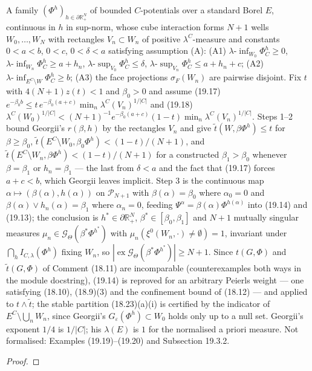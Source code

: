 \begin{theorem}
    A family $(\Phi^h)_{h\in\partial\mathbb R^N_+}$ of bounded $C$-potentials over a standard Borel
    $E$, continuous in $h$ in sup-norm, whose cube interaction forms $N+1$ wells $W_0,\dots,W_N$
    with rectangles $V_n \subset W_n$ of positive $\lambda^C$-measure and constants
    $0<a<b$, $0<c$, $0<\delta<a$ satisfying assumption (A): (A1) $\lambda\text{-}\inf_{W_0}\Phi^h_C
    \ge 0$, $\lambda\text{-}\inf_{W_n}\Phi^h_C \ge a+h_n$, $\lambda\text{-}\sup_{V_0}\Phi^h_C \le
    \delta$, $\lambda\text{-}\sup_{V_n}\Phi^h_C \le a+h_n+c$; (A2) $\lambda\text{-}\inf_{E^C\setminus
    W}\Phi^h_C \ge b$; (A3) the face projections $\sigma_F(W_n)$ are pairwise disjoint. Fix $t$ with
    $4(N+1)z(t)<1$ and $\beta_0>0$ and assume (19.17) $e^{-\beta_0 b} \le t\,e^{-\beta_0(a+c)}
    \min_n \lambda^C(V_n)^{1/|C|}$ and (19.18) $\lambda^C(W_0)^{1/|C|} < (N+1)^{-1}e^{-\beta_0(a+c)}
    (1-t)\min_n\lambda^C(V_n)^{1/|C|}$. Steps 1--2 bound Georgii's $r(\beta,h)$ by the rectangles
    $V_n$ and give $\tilde t(W,\beta\Phi^h)\le t$ for $\beta\ge\beta_0$, $\tilde t(E^C\setminus
    W_0,\beta_0\Phi^h)<(1-t)/(N+1)$, and $\tilde t(E^C\setminus W_n,\beta\Phi^h)<(1-t)/(N+1)$ for a
    constructed $\beta_1>\beta_0$ whenever $\beta=\beta_1$ or $h_n=\beta_1$ --- the last from
    $\delta<a$ and the fact that (19.17) forces $a+c<b$, which Georgii leaves implicit. Step 3 is
    the continuous map $\alpha \mapsto (\beta(\alpha),h(\alpha))$ on $\mathcal P_{N+1}$ with
    $\beta(\alpha)=\beta_0$ where $\alpha_0=0$ and $\beta(\alpha)\vee h_n(\alpha)=\beta_1$ where
    $\alpha_n=0$, feeding $\Psi^\alpha=\beta(\alpha)\Phi^{h(\alpha)}$ into (19.14) and (19.13); the
    conclusion is $h^*\in\partial\mathbb R^N_+$, $\beta^*\in[\beta_0,\beta_1]$ and $N+1$ mutually
    singular measures $\mu_n\in\mathcal G_\Theta(\beta^*\Phi^{h^*})$ with $\mu_n(\xi^0(W_n,\cdot)\ne
    \emptyset)=1$, invariant under $\bigcap_h I_{C,\lambda}(\Phi^h)$ fixing $W_n$, so
    $|\operatorname{ex}\mathcal G_\Theta(\beta^*\Phi^{h^*})|\ge N+1$. Since $t(G,\Phi)$ and
    $\tilde t(G,\Phi)$ of Comment (18.11) are incomparable (counterexamples both ways in the module
    docstring), (19.14) is reproved for an arbitrary Peierls weight --- one satisfying (18.10),
    (18.9)(3) and the confinement bound of (18.12) --- and applied to $t \wedge \tilde t$; the stable
    partition (18.23)(a)(i) is certified by the indicator of $E^C\setminus\bigcup_n W_n$, since
    Georgii's $G_\varepsilon(\Phi^h)\subset W_0$ holds only up to a null set. Georgii's exponent
    $1/4$ is $1/|C|$; his $\lambda(E)$ is $1$ for the normalised a priori measure. Not formalised:
    Examples (19.19)--(19.20) and Subsection 19.3.2.
\end{theorem}
\begin{proof}
    \leanok
\end{proof}
